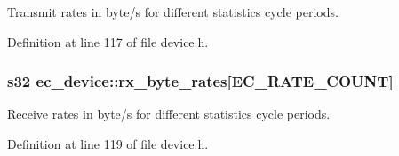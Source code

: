 Transmit rates in byte/s for different statistics cycle periods. 



Definition at line 117 of file device.\-h.

\subsubsection[{rx\-\_\-byte\-\_\-rates}]{\setlength{\rightskip}{0pt plus 5cm}s32 ec\-\_\-device\-::rx\-\_\-byte\-\_\-rates[{\bf E\-C\-\_\-\-R\-A\-T\-E\-\_\-\-C\-O\-U\-N\-T}]}\label{structec__device_a577e0651d974aa3db43fcb8fab639637}


Receive rates in byte/s for different statistics cycle periods. 



Definition at line 119 of file device.\-h.

